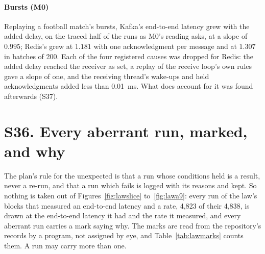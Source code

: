 \documentclass[10pt,journal,onecolumn]{IEEEtran}
\newcommand{\kafka}{Kafka}
\newcommand{\redis}{Redis}
\begin{document}
\paragraph{Bursts (M0)} Replaying a football match's bursts, \kafka{}'s end-to-end latency grew with
the added delay, on the traced half of the runs as M0's reading asks, at a slope of $0.995$; \redis{}'s grew at $1.181$ with one acknowledgment per
message and at $1.307$ in batches of 200. Each of the four registered causes was dropped for
\redis{}: the added delay reached the receiver as set, a replay of the receive loop's own rules
gave a slope of one, and the receiving thread's wake-ups and held acknowledgments added less than
0.01~ms. What does account for it was found afterwards (S37).

\section{S36. Every aberrant run, marked, and why}
\label{sec:lawaberrations}

The plan's rule for the unexpected is that a run whose conditions held is a result, never a
re-run, and that a run which fails is logged with its reasons and kept. So nothing is taken
out of Figures~\ref{fig:lawslice} to~\ref{fig:lawa9}: every run of the law's blocks that measured
an end-to-end latency and a rate, 4,823 of their 4,838, is drawn at the end-to-end latency it had and the rate it
measured, and every aberrant run carries a mark saying why. The
marks are read from the repository's records by a program, not assigned by eye, and
Table~\ref{tab:lawmarks} counts them. A run may carry more than one.
\end{document}
